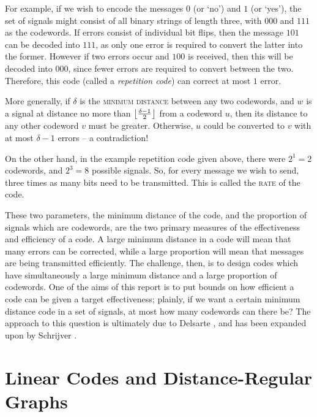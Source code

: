 \documentclass{report}
\begin{document}
    For example, if we wish to encode the messages $0$ (or `no') and $1$ (or
    `yes'), the set of signals might consist of all binary strings of length
    three, with $000$ and $111$ as the codewords.  If errors consist of
    individual bit flips, then the message $101$ can be decoded into $111$, as
    only one error is required to convert the latter into the former.  However
    if two errors occur and $100$ is received, then this will be decoded into
    $000$, since fewer errors are required to convert between the two.
    Therefore, this code (called a \textit{repetition code}) can correct at most
    $1$ error.

    More generally, if $\delta$ is the \textsc{minimum distance} between any two
    codewords, and $w$ is a signal at distance no more than $\left\lfloor \frac{\delta
    - 1}{2} \right\rfloor$ from a codeword $u$, then its distance to any other codeword $v$
    must be greater.  Otherwise, $u$ could be converted to $v$ with at most
    $\delta - 1$ errors -- a contradiction!

    On the other hand, in the example repetition code given above, there were
    $2^1 = 2$ codewords, and $2^3 = 8$ possible signals.  So, for every message
    we wish to send, three times as many bits need to be transmitted.  This is
    called the \textsc{rate} of the code.

    These two parameters, the minimum distance of the code, and the proportion
    of signals which are codewords, are the two primary measures of the
    effectiveness and efficiency of a code.  A large minimum distance in a code
    will mean that many errors can be corrected, while a large proportion will
    mean that messages are being transmitted efficiently.  The challenge, then,
    is to design codes which have simultaneously a large minimum distance and a
    large proportion of codewords.  One of the aims of this report is to put
    bounds on how efficient a code can be given a target effectiveness; plainly,
    if we want a certain minimum distance code in a set of signals, at most how
    many codewords can there be?  The approach to this question is ultimately
    due to Delsarte \cite{delsarte}, and has been expanded upon by Schrijver
    \cite{schrijver}.

  \section{Linear Codes and Distance-Regular
    Graphs}\label{sec:intro:linear->drg}
\end{document}
